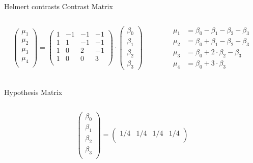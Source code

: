 \documentclass[aspectratio=169]{beamer}
\begin{document}
\begin{frame}{Helmert contrasts}
  \footnotesize
  Contrast Matrix
  \begin{columns}
    \begin{column}[t]{.5\textwidth}
\[
  \begin{pmatrix}
    \mu_1 \\
    \mu_2 \\
    \mu_3 \\
    \mu_4 \\
  \end{pmatrix} = 
  \begin{pmatrix}
    1 & -1 & -1 & -1 \\ 
    1 & 1 & -1 & -1 \\ 
    1 & 0 & 2 & -1 \\ 
    1 & 0 & 0 & 3 \\ 
  \end{pmatrix} \cdot
  \begin{pmatrix}
    \beta_0 \\
    \beta_1 \\
    \beta_2 \\
    \beta_3
  \end{pmatrix}
\]
    \end{column}
    \begin{column}[t]{.5\textwidth}
\begin{align*}
  \mu_1 & = \beta_0 - \beta_1 - \beta_2 - \beta_3 \\
  \mu_2 & = \beta_0 + \beta_1 - \beta_2 - \beta_3 \\
  \mu_3 & = \beta_0 +  2\cdot\beta_2 - \beta_3\\
  \mu_4 & = \beta_0 + 3\cdot\beta_3 \\
\end{align*}
    \end{column}
  \end{columns}
  \vspace{-1.2cm}
  Hypothesis Matrix
  \begin{columns}
    \begin{column}[t]{.5\textwidth}
\[
  \begin{pmatrix}
    \beta_0 \\
    \beta_1 \\
    \beta_2 \\
    \beta_3 \\
  \end{pmatrix} = 
  \begin{pmatrix}
   1/4  &  1/4  &  1/4  & 1/4 \\ 

\end{pmatrix}\]
\end{column}
\end{columns}
\end{frame}
\end{document}
